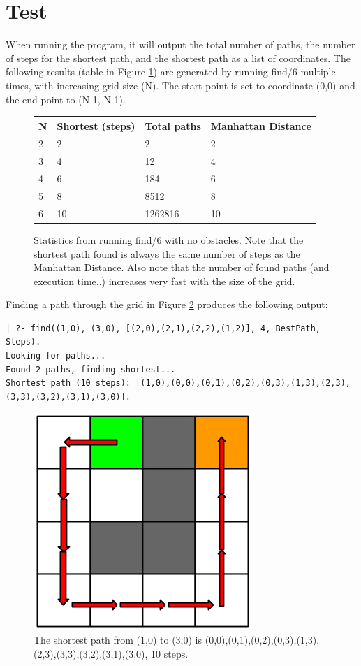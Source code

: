 \documentclass[a4paper]{article}
\begin{document}
\section{Test}
When running the program, it will output the total number of paths, the number of steps for the shortest path, and the shortest path as a list of coordinates. The following results (table in Figure \ref{findN}) are generated by running find/6 multiple times, with increasing grid size (N). The start point is set to coordinate (0,0) and the end point to (N-1, N-1).

\begin{figure}

\begin{center}
    \begin{tabular}{ | l | l | l | l |}
    \hline
    N & Shortest (steps) & Total paths & Manhattan Distance \\ \hline
    2 & 2 & 2 & 2 \\ \hline
    3 & 4 & 12 & 4 \\ \hline
    4 & 6 & 184 & 6 \\ \hline
    5 & 8 & 8512 & 8 \\ \hline
    6 & 10 & 1262816 & 10 \\
    \hline
    \end{tabular}
\end{center}
\caption{Statistics from running find/6 with no obstacles. Note that the shortest path found is always the same number of steps as the Manhattan Distance. Also note that the number of found paths (and execution time..) increases very fast with the size of the grid.}
\label{findN}
\end{figure}
\FloatBarrier

Finding a path through the grid in Figure \ref{path} produces the following output:
\begingroup
    \fontsize{7pt}{10pt}\selectfont
\begin{verbatim}
| ?- find((1,0), (3,0), [(2,0),(2,1),(2,2),(1,2)], 4, BestPath, Steps).
Looking for paths...
Found 2 paths, finding shortest...
Shortest path (10 steps): [(1,0),(0,0),(0,1),(0,2),(0,3),(1,3),(2,3),(3,3),(3,2),(3,1),(3,0)].
\end{verbatim}
\endgroup
\FloatBarrier

\begin{figure}
\centering
	\includegraphics[scale=0.4]{prolog_path}
	\caption{The shortest path from (1,0) to (3,0) is (0,0),(0,1),(0,2),(0,3),(1,3),(2,3),(3,3),(3,2),(3,1),(3,0), 10 steps.}
	\label{path}
\end{figure}
\FloatBarrier
\end{document}
